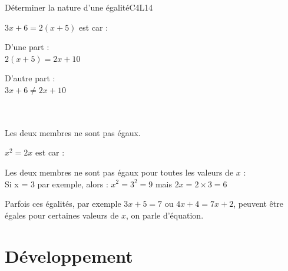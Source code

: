 \def\points{6}
\def\rdifficulty{2}
\begin{EXO}{Déterminer la nature d'une égalité}{C4L14}
    \vspace{-0.25cm}\begin{enumerate}
    $3x+6=2(x+5)$ est  car :
    \begin{crep}
        \begin{minipage}[t]{0.475\textwidth}
            D'une part : \\
            $2(x + 5) = 2x + 10$
        \end{minipage}
        \hfill
        \begin{minipage}[t]{0.475\textwidth}
            D'autre part :\\
            $3x + 6 \neq 2x + 10$
        \end{minipage}\\\\
        Les deux membres ne sont pas égaux.
    \end{crep}

    \vspace{-0.25cm}$x^{2}=2x$ est  car :
    \begin{crep}
        Les deux membres ne sont pas égaux pour toutes les valeurs de $x$ : \\
        Si x = 3 par exemple, alors : $x^2 = 3^2 = 9$ mais $2x = 2\times 3 =6$
    \end{crep}
    \end{enumerate}
\end{EXO}
\vspace{-0.25cm}\begin{Remarque}
    Parfois ces égalités, par exemple $3x+5=7$ ou $4x+4=7x+2$, peuvent être égales pour certaines valeurs de $x$, on parle d'équation.
\end{Remarque}

\newpage
\section{Développement}
